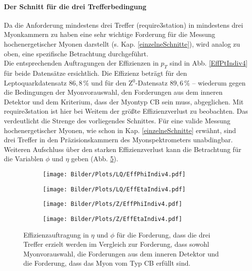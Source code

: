 \paragraph{Der Schnitt für die drei Trefferbedingung}$~~$\\
Da die Anforderung mindestens drei Treffer (require3station) in mindestens drei Myonkammern zu haben eine sehr wichtige Forderung für die Messung hochenergetischer Myonen darstellt (s. Kap. \ref{einzelneSchnitte}), wird analog zu oben, eine spezifische Betrachtung durchgeführt.\\
Die entsprechenden Auftragungen der Effizienzen in $p_T$ sind in Abb. \ref{EffPtIndiv4} für beide Datensätze ersichtlich. Die Effizienz beträgt für den Leptoquarkdatensatz $86{,}8\,\%$ und für den Z$^0$-Datensatz $89{,}6\,\%$ -- wiederum gegen die Bedingungen der Myon\-vor\-auswahl, den Forderungen aus dem inneren Detektor und dem Kriterium, dass der Myontyp CB sein muss, abgeglichen. Mit require3station ist hier bei Weitem der größte Effizienzverlust zu beobachten. Das verdeutlicht die Strenge des vorliegendes Schnittes. Für eine valide Messung hochenergetischer Myonen, wie schon in Kap. \ref{einzelneSchnitte} erwähnt, sind drei Treffer in den Präzisionskammern des Myonspektrometers unabdingbar.\\
Weiteren Aufschluss über den starken Effizienzverlust kann die Betrachtung für die Variablen $\phi$ und $\eta$ geben (Abb. \ref{EffEtaPhiIndiv4}). 
\begin{figure}
\begin{subfigure}[t]{0.55\textwidth}
  \texttt{[image: Bilder/Plots/LQ/EffPhiIndiv4.pdf]}
  \label{EffPhiIndiv4LQ}
\end{subfigure}
  \begin{subfigure}[t]{0.55\textwidth}
  \texttt{[image: Bilder/Plots/LQ/EffEtaIndiv4.pdf]}
  \label{EffEtaIndiv4LQ}
\end{subfigure}
\begin{subfigure}[t]{0.55\textwidth}
 \texttt{[image: Bilder/Plots/Z/EffPhiIndiv4.pdf]}
  \label{EffPhiIndiv4Z}
\end{subfigure}
  \begin{subfigure}[t]{0.55\textwidth}
  \texttt{[image: Bilder/Plots/Z/EffEtaIndiv4.pdf]}
  \label{EffEtaIndiv4Z}
  \end{subfigure}
\caption{Effizienzauftragung in $\eta$ und $\phi$ für die Forderung, dass die drei Treffer erzielt werden im Vergleich zur Forderung, dass sowohl Myonvorauswahl, die Forderungen aus dem inneren Detektor und die Forderung, dass das Myon vom Typ CB erfüllt sind.}
\label{EffEtaPhiIndiv4}
\end{figure}
